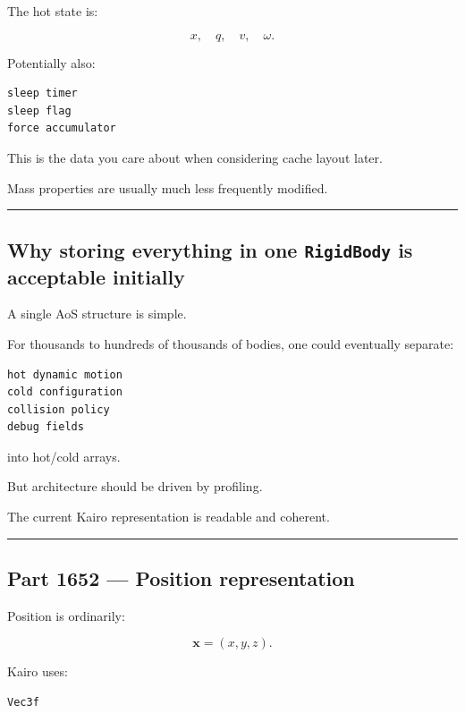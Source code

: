 The hot state is:

\[
x,\quad q,\quad v,\quad\omega.
\]

Potentially also:

\begin{verbatim}
sleep timer
sleep flag
force accumulator
\end{verbatim}

This is the data you care about when considering cache layout later.

Mass properties are usually much less frequently modified.

\begin{center}\rule{0.5\linewidth}{0.5pt}\end{center}

\subsection{\texorpdfstring{Why storing everything in one \texttt{RigidBody} is acceptable initially}{Why storing everything in one RigidBody is acceptable initially}}\label{06-engine-ii-ch037-why-storing-everything-in-one-rigidbody-is-acceptable-initially}

A single AoS structure is simple.

For thousands to hundreds of thousands of bodies, one could eventually separate:

\begin{verbatim}
hot dynamic motion
cold configuration
collision policy
debug fields
\end{verbatim}

into hot/cold arrays.

But architecture should be driven by profiling.

The current Kairo representation is readable and coherent.

\begin{center}\rule{0.5\linewidth}{0.5pt}\end{center}

\subsection{Part 1652 --- Position representation}\label{06-engine-ii-ch037-part-1652-position-representation}

Position is ordinarily:

\[
\mathbf x=(x,y,z).
\]

Kairo uses:

\begin{verbatim}
Vec3f
\end{verbatim}

